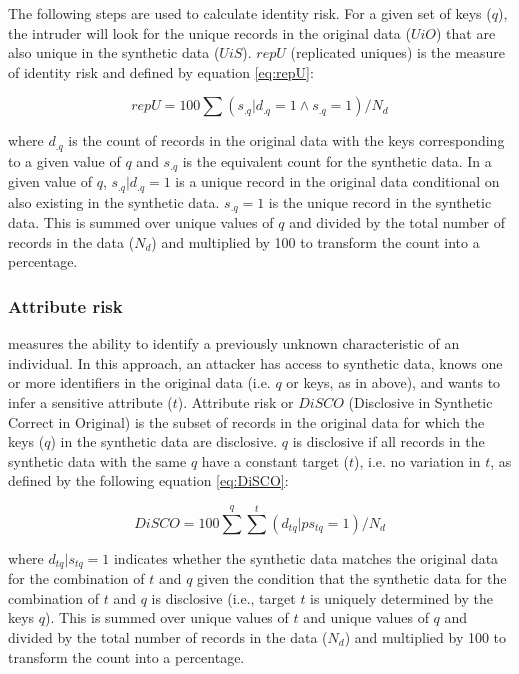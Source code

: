 \documentclass[runningheads]{llncs}
\begin{document}
The following steps are used to calculate identity risk.  For a given set of keys ($q$), the intruder will look for the unique records in the original data ($UiO$) that are also unique in the synthetic data ($UiS$).  $repU$ (replicated uniques) is the measure of identity risk and defined by equation \ref{eq:repU}:

\begin{equation}
repU = 100 \sum (s_{.q}|d_{.q} = 1 \land s_{.q} = 1 )/N_{d}
\label{eq:repU}
\end{equation}

where $d_{.q}$ is the count of records in the original data with the keys corresponding to a given value of $q$ and $s_{.q}$ is the equivalent count for the synthetic data.  In a given value of $q$, $s_{.q}|d_{.q} = 1$ is a unique record in the original data conditional on also existing in the synthetic data.  $s_{.q} = 1$ is the unique record in the synthetic data.  This is summed over unique values of $q$ and divided by the total number of records in the data ($N_{d}$) and multiplied by 100 to transform the count into a percentage.

\subsubsection{Attribute risk} measures the ability to identify a previously unknown characteristic of an individual.  In this approach, an attacker has access to synthetic data, knows one or more identifiers in the original data (i.e. $q$ or keys, as in above), and wants to infer a sensitive attribute ($t$).  Attribute risk or $DiSCO$ (Disclosive in Synthetic Correct in Original) is the subset of records in the original data for which the keys ($q$) in the synthetic data are disclosive. $q$ is disclosive if all records in the synthetic data with the same $q$ have a constant target ($t$), i.e. no variation in $t$, as defined by the following equation \ref{eq:DiSCO}:

\begin{equation}
DiSCO = 100 \sum^{q} \sum^{t} (d_{tq} | ps_{tq} = 1) / N_{d}
\label{eq:DiSCO}
\end{equation}

where $d_{tq} | s_{tq} = 1$ indicates whether the synthetic data matches the original data for the combination of $t$ and $q$ given the condition that the synthetic data for the combination of $t$ and $q$ is disclosive (i.e., target $t$ is uniquely determined by the keys $q$).  This is summed over unique values of $t$ and unique values of $q$ and divided by the total number of records in the data ($N_{d}$) and multiplied by 100 to transform the count into a percentage.
\end{document}
